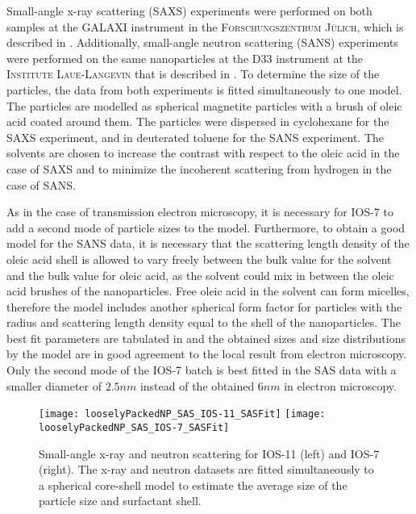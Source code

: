 \documentclass[\main/dresen_thesis.tex]{subfiles}
\begin{document}
Small-angle x-ray scattering (SAXS) experiments were performed on both samples at the \textsc{GALAXI} instrument in the \textsc{Forschungszentrum J\"ulich}, which is described in .
Additionally, small-angle neutron scattering (SANS) experiments were performed on the same nanoparticles at the \textsc{D33} instrument at the \textsc{Institute Laue-Langevin} that is described in .
To determine the size of the particles, the data from both experiments is fitted simultaneously to one model.
The particles are modelled as spherical magnetite particles with a brush of oleic acid coated around them.
The particles were dispersed in cyclohexane for the SAXS experiment, and in deuterated toluene for the SANS experiment.
The solvents are chosen to increase the contrast with respect to the oleic acid in the case of SAXS and to minimize the incoherent scattering from hydrogen in the case of SANS.

As in the case of transmission electron microscopy, it is necessary for IOS-7 to add a second mode of particle sizes to the model.
Furthermore, to obtain a good model for the SANS data, it is necessary that the scattering length density of the oleic acid shell is allowed to vary freely between the bulk value for the solvent and the bulk value for oleic acid, as the solvent could mix in between the oleic acid brushes of the nanoparticles.
Free oleic acid in the solvent can form micelles, therefore the model includes another spherical form factor for particles with the radius and scattering length density equal to the shell of the nanoparticles.
The best fit parameters are tabulated in  and the obtained sizes and size distributions by the model are in good agreement to the local result from electron microscopy.
Only the second mode of the IOS-7 batch is best fitted in the SAS data with a smaller diameter of $2.5 \unit{nm}$ instead of the obtained $6 \unit{nm}$ in electron microscopy.

\begin{figure}[tb]
  \centering
  \texttt{[image: looselyPackedNP\_SAS\_IOS-11\_SASFit]}
  \texttt{[image: looselyPackedNP\_SAS\_IOS-7\_SASFit]}
  \caption{\label{fig:looselyPackedNP:nanoparticle:sas}Small-angle x-ray and neutron scattering for IOS-11 (left) and IOS-7 (right). The x-ray and neutron datasets are fitted simultaneously to a spherical core-shell model to estimate the average size of the particle size and surfactant shell.}
\end{figure}
\end{document}
